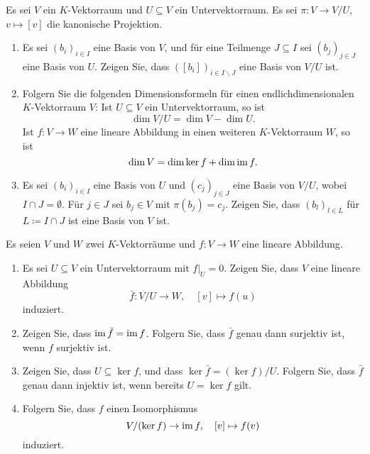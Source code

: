 \documentclass[a4paper,10pt]{scrartcl}
\begin{document}
\begin{question}
  Es sei $V$ ein $K$-Vektorraum und $U \subseteq V$ ein Untervektorraum.
  Es sei $\pi \colon V \to V/\!U$, $v \mapsto [v]$ die kanonische Projektion.
  \begin{enumerate}[leftmargin=*]
    \item
      Es sei $(b_i)_{i \in I}$ eine Basis von $V$, und für eine Teilmenge $J \subseteq I$ sei $(b_j)_{j \in J}$ eine Basis von $U$.
      Zeigen Sie, dass $([b_i])_{i \in I \smallsetminus J}$ eine Basis von $V\!/U$ ist.
    \item
      Folgern Sie die folgenden Di\-men\-si\-ons\-for\-meln für einen end\-lich\-di\-men\-si\-o\-na\-len $K$-Vek\-tor\-raum $V$:
      Ist $U \subseteq V$ ein Untervektorraum, so ist
      \[
        \dim V\!/U = \dim V - \dim U.
      \]
      Ist $f \colon V \to W$ eine lineare Abbildung in einen weiteren $K$-Vektorraum $W$, so ist
      \[
        \dim V = \dim \ker f + \dim \operatorname{im} f.
      \]
    \item
      Es sei $(b_i)_{i \in I}$ eine Basis von $U$ und $(c_j)_{j \in J}$ eine Basis von $V/\!U$, wobei $I \cap J = \emptyset$.
      Für $j \in J$ sei $b_j \in V$ mit $\pi(b_j) = c_j$.
      Zeigen Sie, dass $(b_l)_{l \in L}$ für $L \coloneqq I \cap J$ ist eine Basis von $V$ ist.
  \end{enumerate}
\end{question}


\begin{question}
  Es seien $V$ und $W$ zwei $K$-Vektorräume und $f \colon V \to W$ eine lineare Abbildung.
  \begin{enumerate}[leftmargin=*]
    \item
      Es sei $U \subseteq V$ ein Untervektorraum mit $f|_U = 0$.
      Zeigen Sie, dass $V$ eine lineare Abbildung
      \[
        \bar{f} \colon V\!/U \to W, \quad [v] \mapsto f(u)
      \]
      induziert.
    \item
      Zeigen Sie, dass $\operatorname{im} \bar{f} = \operatorname{im} f$.
      Folgern Sie, dass $\bar{f}$ genau dann surjektiv ist, wenn $f$ surjektiv ist.
    \item
      Zeigen Sie, dass $U \subseteq \ker f$, und dass $\ker \bar{f} = (\ker f)/U$.
      Folgern Sie, dass $\bar{f}$ genau dann injektiv ist, wenn bereits $U = \ker f$ gilt.
    \item
      Folgern Sie, dass $f$ einen Isomorphismus
      \[
        V/(\ker f) \to \operatorname{im} f,
        \quad
        [v] \mapsto f(v)
      \]
      induziert.
  \end{enumerate}
\end{question}
\end{document}
